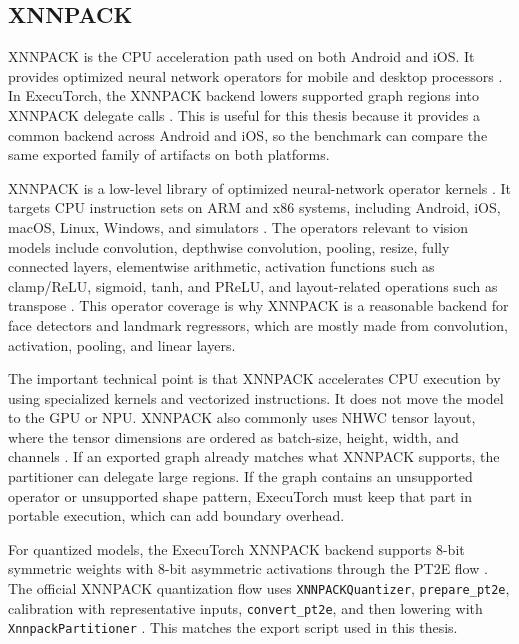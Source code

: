 \subsection{XNNPACK}

XNNPACK is the CPU
acceleration path used on both Android and iOS. It provides optimized neural
network operators for mobile and desktop processors \cite{xnnpack_repo}. In
ExecuTorch, the XNNPACK backend lowers supported graph regions into XNNPACK
delegate calls \cite{executorch_xnnpack}. This is useful for this thesis
because it provides a common backend across Android and iOS, so the benchmark
can compare the same exported family of artifacts on both platforms.

XNNPACK is a low-level library of optimized neural-network operator kernels \cite{xnnpack_repo}. 
It targets CPU instruction sets on ARM and x86 systems, including Android, iOS, macOS, Linux, Windows, and
simulators \cite{xnnpack_repo,executorch_xnnpack}. The operators relevant to
vision models include convolution, depthwise convolution, pooling, resize,
fully connected layers, elementwise arithmetic, activation functions such as
clamp/ReLU, sigmoid, tanh, and PReLU, and layout-related operations such as
transpose \cite{xnnpack_repo}. This operator coverage is why XNNPACK is a
reasonable backend for face detectors and landmark regressors, which are mostly
made from convolution, activation, pooling, and linear layers.

The important technical point is that XNNPACK accelerates CPU execution by
using specialized kernels and vectorized instructions. It does not move the
model to the GPU or NPU. XNNPACK also commonly uses NHWC tensor layout, where
the tensor dimensions are ordered as batch-size, height, width, and channels
\cite{xnnpack_repo}. If an exported graph already matches what XNNPACK
supports, the partitioner can delegate large regions. If the graph contains an
unsupported operator or unsupported shape pattern, ExecuTorch must keep that
part in portable execution, which can add boundary overhead.

For quantized models, the ExecuTorch XNNPACK backend supports 8-bit symmetric
weights with 8-bit asymmetric activations through the PT2E flow
\cite{executorch_xnnpack_quantization}. The official XNNPACK quantization flow
uses \texttt{XNNPACKQuantizer}, \texttt{prepare\_pt2e}, calibration with
representative inputs, \texttt{convert\_pt2e}, and then lowering with
\texttt{XnnpackPartitioner} \cite{executorch_xnnpack_quantization}. This
matches the export script used in this thesis.

